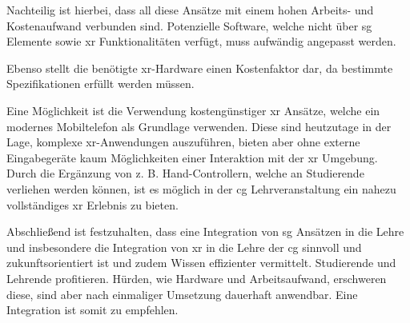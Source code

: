 \documentclass[conference]{IEEEtran}
\begin{document}
Nachteilig ist hierbei, dass all diese Ansätze mit einem hohen Arbeits- und Kostenaufwand verbunden sind.
Potenzielle Software, welche nicht über \gls{sg} Elemente sowie \gls{xr} Funktionalitäten verfügt, muss aufwändig angepasst werden.

Ebenso stellt die benötigte \gls{xr}-Hardware einen Kostenfaktor dar, da bestimmte Spezifikationen erfüllt werden müssen.


Eine Möglichkeit ist die Verwendung kostengünstiger \gls{xr} Ansätze, welche ein modernes Mobiltelefon als Grundlage verwenden.
Diese sind heutzutage in der Lage, komplexe \gls{xr}-Anwendungen auszuführen, bieten aber ohne externe Eingabegeräte kaum Möglichkeiten einer Interaktion mit der \gls{xr} Umgebung.
Durch die Ergänzung von z. B. Hand-Controllern, welche an Studierende verliehen werden können, ist es möglich in der \gls{cg} Lehrveranstaltung ein nahezu vollständiges \gls{xr} Erlebnis zu bieten.


Abschließend ist festzuhalten, dass eine Integration von \gls{sg} Ansätzen in die Lehre und insbesondere die Integration von \gls{xr} in die Lehre der \gls{cg} sinnvoll und zukunftsorientiert ist
und zudem Wissen effizienter vermittelt.
Studierende und Lehrende profitieren. Hürden, wie Hardware und Arbeitsaufwand, erschweren diese, sind aber nach einmaliger Umsetzung dauerhaft anwendbar.
Eine Integration ist somit zu empfehlen.



\begingroup
\end{document}
